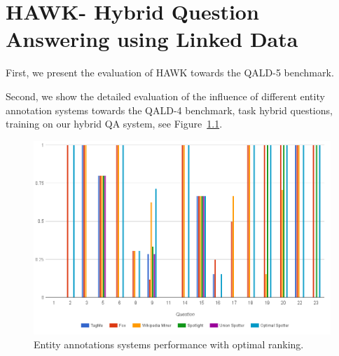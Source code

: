 \chapter{HAWK- Hybrid Question Answering using Linked Data}
\label{cha:app_hawk}


First, we present the evaluation of HAWK towards the  \ac{QALD}-5 benchmark.

{
\scriptsize

}
\clearpage
Second, we show the detailed evaluation of the influence of different entity annotation systems towards the \ac{QALD}-4 benchmark, task hybrid questions, training on our hybrid \ac{QA} system, see Figure~\ref{chahawk:fig:EntityAnnotators}.
\begin{figure}[htb!]
\centering
\includegraphics[width=\linewidth]{Appendix/fig/bars}
\caption{Entity annotations systems performance with optimal ranking.}
\label{chahawk:fig:EntityAnnotators}
\end{figure}
